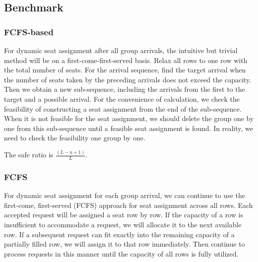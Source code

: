 



\subsection{Benchmark}
 

\subsubsection{FCFS-based}\label{FCFS-based}

For dynamic seat assignment after all group arrivals, the intuitive but trivial method will be on a first-come-first-served basis. Relax all rows to one row with the total number of seats. For the arrival sequence, find the target arrival when the number of seats taken by the preceding arrivals does not exceed the capacity.
Then we obtain a new sub-sequence, including the arrivals from the first to the target and a possible arrival. For the convenience of calculation, we check the feasibility of constructing a seat assignment from the end of the sub-sequence. When it is not feasible for the seat assignment, we should delete the group one by one from this sub-sequence until a feasible seat assignment is found. In reality, we need to check the feasibility one group by one.

The safe ratio is $\frac{(L -u +1)}{L}$.


\subsubsection{FCFS}\label{largest_pattern}
For dynamic seat assignment for each group arrival, we can continue to use the first-come, first-served (FCFS) approach for seat assignment across all rows. Each accepted request will be assigned a seat row by row. If the capacity of a row is insufficient to accommodate a request, we will allocate it to the next available row. If a subsequent request can fit exactly into the remaining capacity of a partially filled row, we will assign it to that row immediately. Then continue to process requests in this manner until the capacity of all rows is fully utilized.

